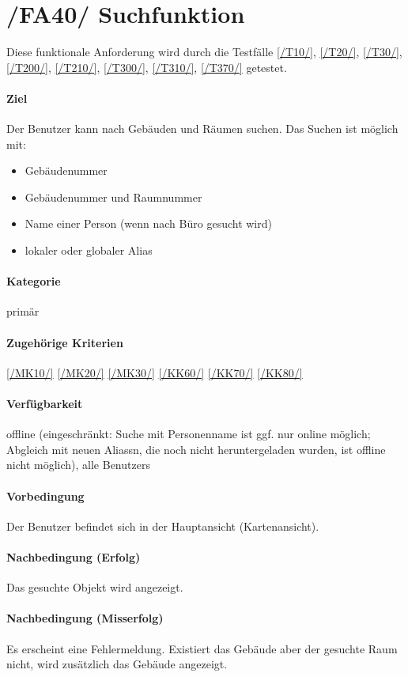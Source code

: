 \section[Suchfunktion]{/FA40/ Suchfunktion}
\label{/FA40/}
Diese funktionale Anforderung wird durch die Testfälle \ref{/T10/}, \ref{/T20/}, \ref{/T30/}, \ref{/T200/}, \ref{/T210/}, \ref{/T300/}, \ref{/T310/}, \ref{/T370/} getestet.
\paragraph{Ziel}
Der \Gls{Benutzer} kann nach Gebäuden und Räumen suchen. 
Das Suchen ist möglich mit:
\begin{itemize}
    \item Gebäudenummer
    \item Gebäudenummer und Raumnummer
    \item Name einer Person (wenn nach Büro gesucht wird)
    \item \gls{lokal}er oder \gls{global}er \Gls{Alias}
\end{itemize}

\paragraph{Kategorie}
primär
\paragraph{Zugehörige Kriterien}
\ref{/MK10/} \ref{/MK20/} \ref{/MK30/} \ref{/KK60/} \ref{/KK70/} \ref{/KK80/} 
\paragraph{Verfügbarkeit}
\gls{offline} (eingeschränkt: Suche mit Personenname ist ggf. nur online möglich; Abgleich mit neuen \Glspl{Alias}n, die noch nicht heruntergeladen wurden, ist \gls{offline} nicht möglich), alle \Glspl{Benutzer}
\paragraph{Vorbedingung}
Der \Gls{Benutzer} befindet sich in der Hauptansicht (\Gls{Kartenansicht}).
\paragraph{Nachbedingung (Erfolg)}
Das gesuchte Objekt wird angezeigt.
\paragraph{Nachbedingung (Misserfolg)}
Es erscheint eine Fehlermeldung. Existiert das Gebäude aber der gesuchte Raum nicht, wird zusätzlich das Gebäude angezeigt.
